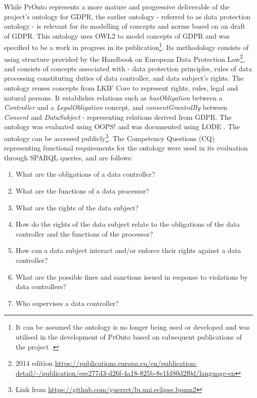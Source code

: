 While PrOnto represents a more mature and progressive deliverable of the project's ontology for GDPR, the earlier ontology - referred to as data protection ontology \cite{otake_using_2017} - is relevant for its modelling of concepts and norms based on an draft of GDPR. This ontology uses OWL2 to model concepts of GDPR and was specified to be a work in progress in its publication\footnote{It can be assumed the ontology is no longer being used or developed and was utilised in the development of PrOnto based on subsequent publications of the project \cite{bartolini_legal_2018,bartolini_enhancing_2019}.}.
Its methodology consists of using structure provided by the Handbook on European Data Protection Law\footnote{2014 edition \url{https://publications.europa.eu/en/publication-detail/-/publication/eee277d3-d26f-4a18-825b-8e1fd80d2f0d/language-en}}, and consists of concepts associated with - data protection principles, rules of data processing constituting duties of data controller, and data subject's rights.
The ontology reuses concepts from LKIF Core \cite{hoekstra_lkif_2007} to represent rights, rules, legal and natural persons. It establishes relations such as \textit{hasObligation} between a \textit{Controller} and a \textit{LegalObligation} concept, and \textit{consentGrantedBy} between \textit{Consent} and \textit{DataSubject} - representing relations derived from GDPR.
The ontology was evaluated using OOPS! \cite{poveda-villalon_oops!_2014} and was documented using LODE \cite{peroni_tools_2013}. The ontology can be accessed publicly\footnote{Link from \cite{otake_using_2017} \url{https://github.com/guerret/lu.uni.eclipse.bpmn2}}.
The Competency Questions (CQ) representing functional requirements for the ontology were used in its evaluation through SPARQL queries, and are follows:
\begin{enumerate}
    \item What are the obligations of a data controller?
    \item What are the functions of a data processor?
    \item What are the rights of the data subject?
    \item How do the rights of the data subject relate to the obligations of the data controller and the functions of the processor?
    \item How can a data subject interact and/or enforce their rights against a data controller?
    \item What are the possible fines and sanctions issued in response to violations by data controllers?
    \item Who supervises a data controller?
\end{enumerate}

